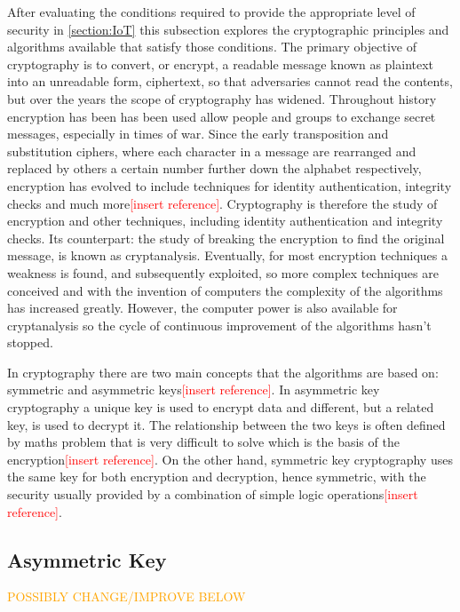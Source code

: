\documentclass[12pt,twoside,a4paper]{report}
\begin{document}
	After evaluating the conditions required to provide the appropriate level of security  in \autoref{section:IoT} this subsection explores the cryptographic principles and algorithms available that satisfy those conditions. The primary objective of cryptography is to convert, or encrypt, a readable message known as plaintext into an unreadable form, ciphertext, so that adversaries cannot read the contents, but over the years the scope of cryptography has widened. Throughout history encryption has been has been used allow people and groups to exchange secret messages, especially in times of war. Since the early transposition and substitution ciphers, where each character in a message are rearranged and replaced by others a certain number further down the alphabet respectively, encryption has evolved to include techniques for identity authentication, integrity checks and much more\textcolor{red}{[insert reference]}. Cryptography is therefore the study of encryption and other techniques, including identity authentication and integrity checks. Its counterpart: the study of breaking the encryption to find the original message, is known as cryptanalysis\cite{AlfredJ.Menezes1996}. Eventually, for most encryption techniques a weakness is found, and subsequently exploited, so more complex techniques are conceived and with the invention of computers the complexity of the algorithms has increased greatly. However, the computer power is also available for cryptanalysis so the cycle of continuous improvement of the algorithms hasn't stopped.
    
	In cryptography there are two main concepts that the algorithms are based on: symmetric and asymmetric keys\textcolor{red}{[insert reference]}. In asymmetric key cryptography a unique key is used to encrypt data and different, but a related key, is used to decrypt it. The relationship between the two keys is often defined by maths problem that is very difficult to solve which is the basis of the encryption\textcolor{red}{[insert reference]}. On the other hand, symmetric key cryptography uses the same key for both encryption and decryption, hence symmetric, with the security usually provided by a combination of simple logic operations\textcolor{red}{[insert reference]}.
    
	\subsection{Asymmetric Key}
	\textcolor{orange}{POSSIBLY CHANGE/IMPROVE BELOW}
    
\end{document}
